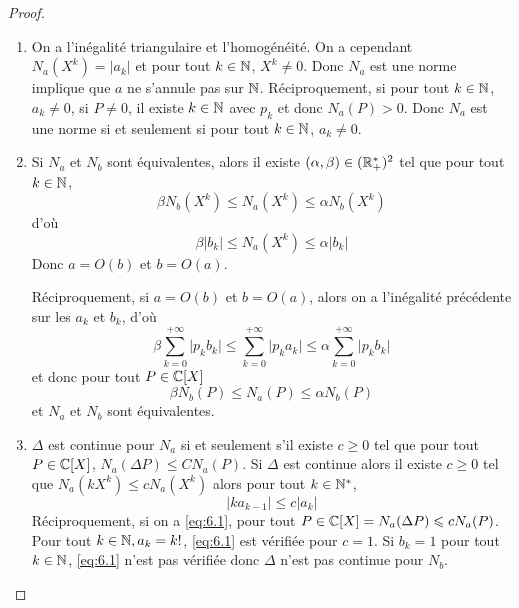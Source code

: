 \begin{proof}
	\phantom{}
	\begin{enumerate}
		\item On a l'inégalité triangulaire et l'homogénéité. On a cependant $N_{a}(X^{k})=\vert a_{k}\vert$ et pour tout $k\in\mathbb{N}$, $X^{k}\neq0$. Donc $N_{a}$ est une norme implique que $a$ ne s'annule pas sur $\mathbb{N}$. Réciproquement, si pour tout $k\in\mathbb{N}$, $a_{k}\neq0$, si $P\neq0$, il existe $k\in\mathbb{N}$ avec $p_{k}$ et donc $N_{a}(P)>0$. Donc $N_{a}$ est une norme si et seulement si pour tout $k\in\mathbb{N}$, $a_{k}\neq0$.
		
		\item Si $N_{a}$ et $N_{b}$ sont équivalentes, alors il existe $(\alpha,\beta)\in(\mathbb{R}_{+}^{*})^{2}$ tel que pour tout $k\in\mathbb{N}$,
		\begin{equation}\beta N_{b}(X^{k})\leqslant N_{a}(X^{k})\leqslant\alpha N_{b}(X^{k})\end{equation}
		d'où
		\begin{equation}\beta \vert b_{k}\vert\leqslant N_{a}(X^{k})\leqslant\alpha \vert b_{k}\vert\end{equation}
		Donc $a=O(b)$ et $b=O(a)$.

		Réciproquement, si $a=O(b)$ et $b=O(a)$, alors on a l'inégalité précédente sur les $a_{k}$ et $b_{k}$, d'où
		\begin{equation}\beta\sum_{k=0}^{+\infty}\vert p_{k}b_{k}\vert\leqslant\sum_{k=0}^{+\infty}\vert p_{k}a_{k}\vert\leqslant\alpha\sum_{k=0}^{+\infty}\vert p_{k} b_{k}\vert\end{equation}
		et donc pour tout $P\in\mathbb{C}[X]$
		\begin{equation}\beta N_{b}(P)\leqslant N_{a}(P)\leqslant\alpha N_{b}(P)\end{equation}
		et $N_{a}$ et $N_{b}$ sont équivalentes.

		\item $\Delta$ est continue pour $N_{a}$ si et seulement s'il existe $c\geqslant0$ tel que pour tout $P\in\mathbb{C}[X]$, $N_{a}(\Delta P)\leqslant CN_{a}(P)$. Si $\Delta$ est continue alors il existe $c\geqslant0$ tel que $N_{a}(kX^{k})\leqslant cN_{a}(X^{k})$ alors pour tout $k\in\mathbb{N}^{*}$,
		\begin{equation}
			\label{eq:6.1}
			\vert ka_{k-1}\vert\leqslant c\vert a_{k}\vert
		\end{equation}
		Réciproquement, si on a \eqref{eq:6.1}, pour tout $P\in\mathbb{C}[X]=N_{a}(\Delta P)\leqslant cN_{a}(P)$. Pour tout $k\in\mathbb{N},a_{k}=k!$, \eqref{eq:6.1} est vérifiée pour $c=1$. Si $b_{k}=1$ pour tout $k\in\mathbb{N}$, \eqref{eq:6.1} n'est pas vérifiée donc $\Delta$ n'est pas continue pour $N_{b}$.
	\end{enumerate}
\end{proof}

